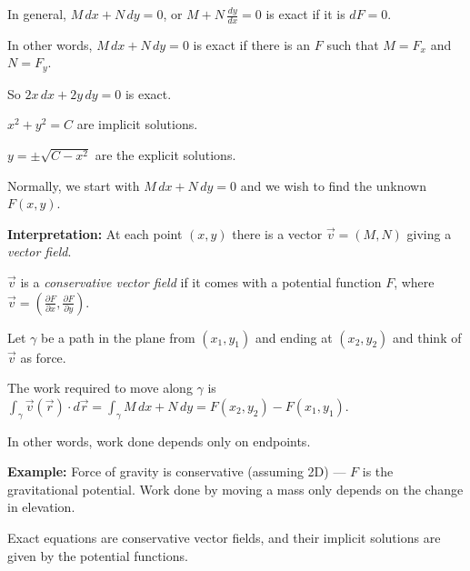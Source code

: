 \documentclass[10pt,aspectratio=169]{beamer}
\begin{document}
\begin{frame}

In general, \quad
$M \, dx + N \, dy = 0$, \quad
or
\quad
$M + N \, \frac{dy}{dx} = 0$ \quad
is exact if it is \quad $dF = 0$.

\medskip
\pause

In other words, $M \, dx + N \, dy = 0$ is exact if there is an $F$ such that $M = F_x$ and $N=F_y$.

\medskip
\pause

So 
\quad
$2x \, dx + 2y \, dy = 0$
\quad
is exact.

\medskip
\pause

$x^2+y^2=C$ are implicit solutions.

\medskip
\pause

$y = \pm \sqrt{C-x^2}$ are the explicit solutions.

\medskip
\pause

Normally, we start with $M \, dx + N \, dy = 0$ and we wish to find the
unknown $F(x,y)$.
\end{frame}

\begin{frame}
\textbf{Interpretation:}
At each point $(x,y)$ there is a vector $\vec{v} = (M,N)$ giving a \emph{vector
field}.

\medskip
\pause

$\vec{v}$ is a \emph{conservative vector field} if it comes with a potential
function $F$, where
$\vec{v} = \left( \frac{\partial F}{\partial x} ,\frac{\partial F}{\partial
y} \right)$.

\medskip
\pause

Let $\gamma$ be a path in the plane from $(x_1,y_1)$ and ending at
$(x_2,y_2)$ and think of $\vec{v}$ as force.

\medskip

The work required to move along $\gamma$ is
\quad
$\displaystyle
\int_\gamma \vec{v}(\vec{r}) \cdot d\vec{r}
=
\int_\gamma M \, dx + N \, dy
=
F(x_2,y_2) - F(x_1,y_1)$.

\medskip
\pause

In other words, work done depends only on endpoints.

\medskip
\pause

\textbf{Example:} Force of gravity is conservative (assuming 2D)
--- $F$ is the gravitational potential.
\pause
Work done by moving a mass only depends on the change in elevation.

\medskip
\pause

Exact equations are conservative vector fields, and
their
implicit solutions are given by the potential functions.

\end{frame}
\end{document}
